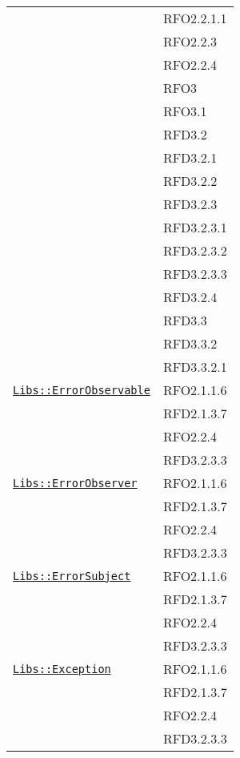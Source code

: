 \begin{longtable}{|>{\centering}m{10cm}|m{3cm}<{\centering}|}
& RFO2.2.1.1\\
& RFO2.2.3\\
& RFO2.2.4\\
& RFO3\\
& RFO3.1\\
& RFD3.2\\
& RFD3.2.1\\
& RFD3.2.2\\
& RFD3.2.3\\
& RFD3.2.3.1\\
& RFD3.2.3.2\\
& RFD3.2.3.3\\
& RFD3.2.4\\
& RFD3.3\\
& RFD3.3.2\\
& RFD3.3.2.1\\ \hline

\hyperref[Libs::ErrorObservable]{\texttt{Libs::ErrorObservable}} & RFO2.1.1.6\\
& RFD2.1.3.7\\
& RFO2.2.4\\
& RFD3.2.3.3\\ \hline

\hyperref[Libs::ErrorObserver]{\texttt{Libs::ErrorObserver}} & RFO2.1.1.6\\
& RFD2.1.3.7\\
& RFO2.2.4\\
& RFD3.2.3.3\\ \hline

\hyperref[Libs::ErrorSubject]{\texttt{Libs::ErrorSubject}} & RFO2.1.1.6\\
& RFD2.1.3.7\\
& RFO2.2.4\\
& RFD3.2.3.3\\ \hline

\hyperref[Libs::Exception]{\texttt{Libs::Exception}} & RFO2.1.1.6\\
& RFD2.1.3.7\\
& RFO2.2.4\\
& RFD3.2.3.3\\ \hline


\end{longtable}
